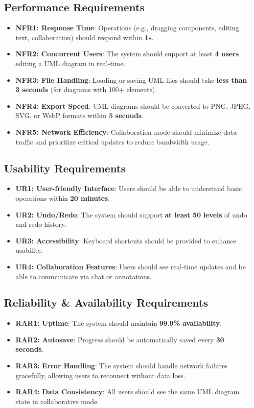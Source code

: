 \documentclass[12pt]{article}
\begin{document}
    \subsection{Performance Requirements}
    \begin{itemize}
        \item \textbf{NFR1: Response Time}: Operations (e.g., dragging components, editing text, collaboration) should respond within \textbf{1s}.
        \item \textbf{NFR2: Concurrent Users}: The system should support at least \textbf{4 users} editing a UML diagram in real-time.
        \item \textbf{NFR3: File Handling}: Loading or saving UML files should take \textbf{less than 3 seconds} (for diagrams with 100+ elements).
        \item \textbf{NFR4: Export Speed}: UML diagrams should be converted to PNG, JPEG, SVG, or WebP formats within \textbf{5 seconds}.
        \item \textbf{NFR5: Network Efficiency}: Collaboration mode should minimize data traffic and prioritize critical updates to reduce bandwidth usage.
    \end{itemize}

    \subsection{Usability Requirements}
    \begin{itemize}
        \item \textbf{UR1: User-friendly Interface}: Users should be able to understand basic operations within \textbf{20 minutes}.
        \item \textbf{UR2: Undo/Redo}: The system should support \textbf{at least 50 levels} of undo and redo history.
        \item \textbf{UR3: Accessibility}: Keyboard shortcuts should be provided to enhance usability.
        \item \textbf{UR4: Collaboration Features}: Users should see real-time updates and be able to communicate via chat or annotations.
    \end{itemize}

    \subsection{Reliability \& Availability Requirements}
    \begin{itemize}
        \item \textbf{RAR1: Uptime}: The system should maintain \textbf{99.9\% availability}.
        \item \textbf{RAR2: Autosave}: Progress should be automatically saved every \textbf{30 seconds}.
        \item \textbf{RAR3: Error Handling}: The system should handle network failures gracefully, allowing users to reconnect without data loss.
        \item \textbf{RAR4: Data Consistency}: All users should see the same UML diagram state in collaborative mode.
    \end{itemize}
\end{document}
